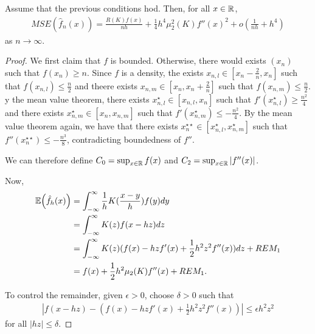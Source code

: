 \begin{thm}
  \label{defn:Introduction:3}
  Assume that the previous conditions hod. Then, for all $x \in \mathbb{R}$,
  \begin{align}
    \label{eq:15}
    MSE(\hat f_{n}(x)) = \frac{R(K) f(x)}{nh} + \frac{1}{4} h^{4}
    \mu_{2}^{2}(K) f''(x)^{2} + o(\frac{1}{nh} + h^{4})
  \end{align} as $n \rightarrow \infty$.
\end{thm}

\begin{proof}
  We first claim that $f$ is bounded. Otherwise, there would exists
  $(x_{n})$ such that $f(x_{n}) \geq n$.  Since $f$ is a density, the
  exists $x_{n, l} \in [x_{n} - \frac{2}{n}, x_{n}]$ such that
  $f(x_{n, l}) \leq \frac{n}{2}$  and theere exists $x_{n, m} \in
  [x_{n}, x_{n} + \frac{2}{n}]$ such that $f(x_{n, m}) \leq
  \frac{n}{2}$.  y the mean value theorem, there exists $x^{\star}_{n,
  l} \in [x_{n, l}, x_{n}]$ such that $f'(x^{\star}_{n, l}) \geq
\frac{n^{2}}{4}$ and there exists $x^{\star}_{n, m} \in [x_{n}, x_{n,
  m}]$ such that $f'(x^{\star}_{n, m}) \leq -\frac{n^{2}}{4}$.  By the
mean value theorem again, we have that there exists $x_{n}^{\star
  \star} \in [x_{n, l}^{\star}, x_{n, m}^{\star}]$ such that
$f''(x_{n}^{\star \star}) \leq -\frac{n^{3}}{8}$, contradicting
boundedness of $f''$.

We can therefore define $C_{0} = \sup_{x \in \mathbb{R}} f(x)$ and $C_{2} =
\sup_{x \in \mathbb{R}} |f''(x)|$.

Now,
\begin{align}
  \label{eq:16}
  \E{\hat f_{h}(x)} &= \int_{-\infty}^{\infty} \frac{1}{h}
  K(\frac{x-y}{h}) f(y) dy \\
  &= \int_{-\infty}^{\infty}  K(z) f(x - hz) dz \\
  &= \int_{-\infty}^{\infty} K(z)(f(x) - hz f'(x) + \frac{1}{2} h^{2}
  z^{2} f''(x)) dz + REM_{1} \\
  &= f(x) + \frac{1}{2} h^{2} \mu_{2}(K) f''(x) + REM_{1}.
\end{align}

To control the remainder, given $\epsilon > 0$, choose $\delta > 0$
such that
\begin{align}
  \label{eq:17}
  |f(x - hz) - (f(x) - hz f'(x) + \frac{1}{2} h^{2} z^{2} f''(x))|
  \leq \epsilon h^{2} z^{2}
\end{align} for all $|hz| \leq \delta$.


\end{proof}
